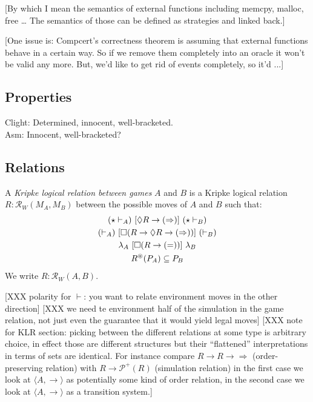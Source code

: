 \documentclass[acmsmall,anonymous]{acmart}
\newcommand{\ifr}[1]{\ [{#1}]\ }
\begin{document}
[By which I mean the semantics of external functions
including memcpy, malloc, free \ldots
The semantics of those can be defined as strategies
and linked back.]

[One issue is:
Compcert's correctness theorem is
assuming that external functions behave in a certain way.
So if we remove them completely into an oracle
it won't be valid any more.
But,
we'd like to get rid of events completely,
so it'd ...]


\subsection{Properties} %

Clight: Determined, innocent, well-bracketed. \\
Asm: Innocent, well-bracketed?


\subsection{Relations} %

A \emph{Kripke logical relation between games} $A$ and $B$
is a Kripke logical relation $R : \mathcal{R}_W(M_A, M_B)$
between the possible moves of $A$ and $B$
such that:
\begin{gather*}
  (\star \vdash_A) \ifr{\Diamond R \rightarrow (\Rightarrow)} (\star \vdash_B) \\
  (\vdash_A) \ifr{\Box(R \rightarrow \Diamond R \rightarrow (\Rightarrow))} (\vdash_B) \\
  \lambda_A \ifr{\Box (R \rightarrow (=))} \lambda_B \\
  R^\oast(P_A) \subseteq P_B
\end{gather*}
We write $R : \mathcal{R}_W(A, B)$.


[XXX polarity for $\vdash$: you want to relate environment moves
in the other direction]
[XXX we need te environment half of the simulation
in the game relation, not just even the guarantee that it would yield
legal moves]
[XXX note for KLR section: picking between
the different relations at some type is arbitrary choice,
in effect those are different structures
but their ``flattened'' interpretations in terms of sets are identical.
For instance compare $R \rightarrow R \rightarrow \Rightarrow$
(order-preserving relation)
with $R \rightarrow \mathcal{P}^+(R)$
(simulation relation)
in the first case we look at $\langle A, \rightarrow \rangle$
as potentially some kind of order relation,
in the second case we look at $\langle A, \rightarrow \rangle$
as a transition system.]
\end{document}
